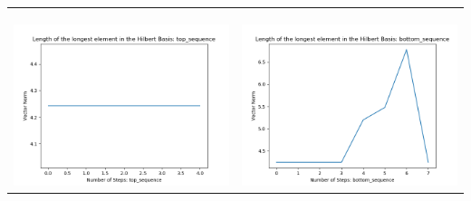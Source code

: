 \documentclass[10pt]{article}
\begin{document}
\begin{tabular}{c|c}
\begin{minipage}{.45\textwidth}
\end{minipage} \\ \\
\hline \\\begin{minipage}{.45\textwidth}
\includegraphics[width=\textwidth]{"DATA/4d/4 generators 2 bound H/top_sequence LENGTH"}
\end{minipage} &
\begin{minipage}{.45\textwidth}
\includegraphics[width=\textwidth]{"DATA/4d/4 generators 2 bound H bottomup/bottom_sequence LENGTH"}
\end{minipage}
\end{tabular}
\end{document}
